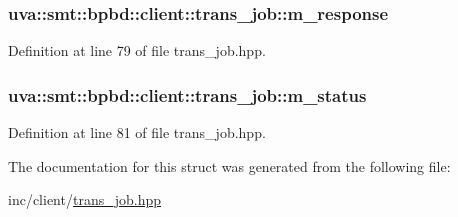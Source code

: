 \subsubsection[{m\+\_\+response}]{ uva\+::smt\+::bpbd\+::client\+::trans\+\_\+job\+::m\+\_\+response}\label{structuva_1_1smt_1_1bpbd_1_1client_1_1trans__job_a684731a5672adf930cc93e9759a30974}


Definition at line 79 of file trans\+\_\+job.\+hpp.

\hypertarget{structuva_1_1smt_1_1bpbd_1_1client_1_1trans__job_a11a9bf2812991f8e4e36b3884dc149f7}{}
\subsubsection[{m\+\_\+status}]{ uva\+::smt\+::bpbd\+::client\+::trans\+\_\+job\+::m\+\_\+status}\label{structuva_1_1smt_1_1bpbd_1_1client_1_1trans__job_a11a9bf2812991f8e4e36b3884dc149f7}


Definition at line 81 of file trans\+\_\+job.\+hpp.



The documentation for this struct was generated from the following file\+:\begin{DoxyCompactItemize}
\item 
inc/client/\hyperlink{client_2trans__job_8hpp}{trans\+\_\+job.\+hpp}\end{DoxyCompactItemize}
